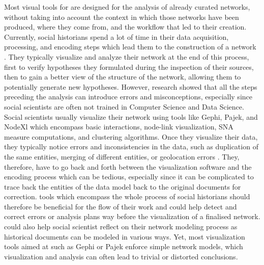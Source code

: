 Most visual tools for \sna are designed for the analysis of already curated networks, without taking into account the context in which those networks have been produced, where they come from, and the workflow that led to their creation.
Currently, social historians spend a lot of time in their data acquisition, processing, and encoding steps which lead them to the construction of a network \cite{lemercierBackSourcesPracticing2021}.
They typically visualize and analyze their network at the end of this process, first to verify hypotheses they formulated during the inspection of their sources, then to gain a better view of the structure of the network, allowing them to potentially generate new hypotheses\cite{dufournaudCommentRendreVisible2018}.
However, research showed that all the steps preceding the analysis can introduce errors and misconceptions, especially since social scientists are often not trained in Computer Science and Data Science\cite{lemercier12FormalNetwork2015, alkadi2022}.
Social scientists usually visualize their network using \sna tools like Gephi\cite{Gephi}, Pajek\cite{pajek}, and NodeXl\cite{noauthor_nodexl_nodate} which encompass basic interactions, node-link visualization, SNA measure computations, and clustering algorithms.
Once they visualize their data, they typically notice errors and inconsistencies in the data, such as duplication of the same entities, merging of different entities, or geolocation errors \cite{alkadi2022}.
They, therefore, have to go back and forth between the visualization software and the encoding process which can be tedious, especially since it can be complicated to trace back the entities of the data model back to the original documents for correction.
\va tools which encompass the whole process of social historians should therefore be beneficial for the flow of their work and could help detect and correct errors or analysis plans way before the visualization of a finalised network.
\va could also help social scientist reflect on their network modeling process as historical documents can be modeled in various ways\cite{cristofoliAuxSourcesGrands2008}.
Yet, most visualization tools aimed at \hsna such as Gephi\cite{Gephi} or Pajek\cite{pajek} enforce simple network models, which visualization and analysis can often lead to trivial or distorted conclusions\cite{lemercier12FormalNetwork2015}.
